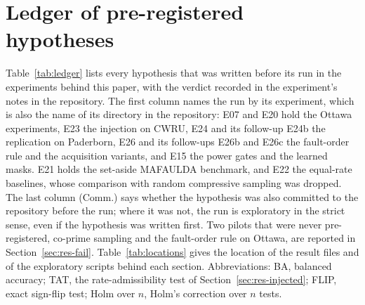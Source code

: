 \section{Ledger of pre-registered hypotheses}
\label{app:ledger}

Table~\ref{tab:ledger} lists every hypothesis that was written before its run in the experiments
behind this paper, with the verdict recorded in the experiment's notes in the repository. The first
column names the run by its experiment, which is also the name of its directory in the repository:
E07 and E20 hold the Ottawa experiments, E23 the injection on CWRU, E24 and its follow-up E24b the
replication on Paderborn, E26 and its follow-ups E26b and E26c the fault-order rule and the
acquisition variants, and E15 the power gates and the learned masks. E21 holds the set-aside
MAFAULDA benchmark, and E22 the equal-rate baselines, whose comparison with random compressive
sampling was dropped. The last column (Comm.) says whether the hypothesis was also committed to the
repository before the run; where it was not, the run is exploratory in the strict sense, even if
the hypothesis was written first. Two pilots that were never pre-registered, co-prime sampling and
the fault-order rule on Ottawa, are reported in Section~\ref{sec:res-fail}. Table~\ref{tab:locations}
gives the location of the result files and of the exploratory scripts behind each section.
Abbreviations: BA, balanced accuracy; TAT, the rate-admissibility test of
Section~\ref{sec:res-injected}; FLIP, exact sign-flip test; Holm over $n$, Holm's correction over
$n$ tests.

